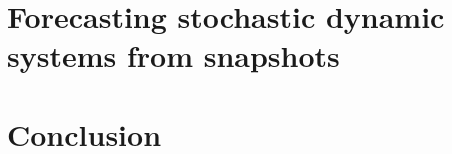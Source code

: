 \documentclass[twoside]{mitthesis} %
\begin{document}
\chapter{Forecasting stochastic dynamic systems from snapshots}
\label{ch:snapmmd}

{

}

\chapter{Conclusion}
\label{ch:conclusion}

{

}












\end{document}
